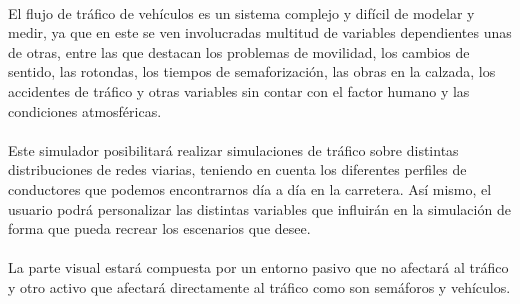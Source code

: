 \paragraph{}
El flujo de tráfico de vehículos es un sistema complejo y difícil de modelar y medir, ya que en este se ven involucradas multitud de variables dependientes unas de otras, entre las que destacan los problemas de movilidad, los cambios de sentido, las rotondas, los tiempos de semaforización, las obras en la calzada, los accidentes de tráfico y otras variables sin contar con el factor humano y las condiciones atmosféricas.

\paragraph{}
Este simulador posibilitará realizar simulaciones de tráfico sobre distintas distribuciones de redes viarias, teniendo en cuenta los diferentes perfiles de conductores que podemos encontrarnos día a día en la carretera. Así mismo, el usuario podrá personalizar las distintas variables que influirán en la simulación de forma que pueda recrear los escenarios que desee.

\paragraph{}
La parte visual estará compuesta por un entorno pasivo que no afectará al tráfico y otro activo que afectará directamente al tráfico como son semáforos y vehículos. 
